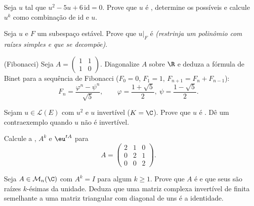 \begin{exercise}[$\star$]\label{exo:b2:reduction:3}
Seja $u$ tal que $u^2 - 5u + 6\,\mathrm{id} = 0$. Prove que $u$ é
, determine os  possíveis e calcule $u^k$
como combinação de $\mathrm{id}$ e $u$.
\end{exercise}

\begin{exercise}[$\star\star$]\label{exo:b2:reduction:4}
Seja $u$  e $F$ um subespaço estável. Prove que
$u|_F$ é  \emph{(restrinja um polinômio 
com raízes simples e que se decompõe)}.
\end{exercise}

\begin{exercise}[$\star\star$]\label{exo:b2:reduction:5}
(Fibonacci) Seja $A = \begin{pmatrix} 1 & 1\\ 1 & 0\end{pmatrix}$.
Diagonalize $A$ sobre $\R$ e deduza a fórmula de Binet para a
sequência de Fibonacci ($F_0 = 0$, $F_1 = 1$, $F_{n+1} = F_n +
F_{n-1}$):
\[
F_n = \frac{\varphi^n - \psi^n}{\sqrt 5},
\qquad \varphi = \frac{1 + \sqrt5}{2},\ \psi = \frac{1 -
\sqrt5}{2}.
\]
\end{exercise}

\begin{exercise}[$\star\star$]\label{exo:b2:reduction:6}
Sejam $u \in \mathcal{L}(E)$ com $u^2$  e $u$
invertível ($K = \C$). Prove que $u$ é . Dê um
contraexemplo quando $u$ não é invertível.
\end{exercise}

\begin{exercise}[$\star\star$]\label{exo:b2:reduction:7}
Calcule a , $A^k$ e $\eu^{tA}$ para
\[
A = \begin{pmatrix} 2 & 1 & 0\\ 0 & 2 & 1\\ 0 & 0 & 2
\end{pmatrix}.
\]
\end{exercise}

\begin{exercise}[$\star\star$]\label{exo:b2:reduction:8}
Seja $A \in \mathcal{M}_n(\C)$ com $A^k = I$ para algum $k \geq 1$.
Prove que $A$ é  e que seus  são raízes
$k$-ésimas da unidade. Deduza que uma matriz complexa invertível de  finita
semelhante a uma matriz triangular com diagonal de uns é a identidade.
\end{exercise}

